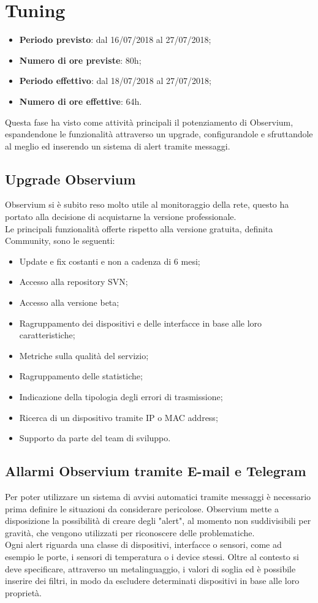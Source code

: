 \documentclass[Realizzazione.tex]{subfiles}
\begin{document}
\section{Tuning}
\begin{itemize}
	\item \textbf{Periodo previsto}: dal 16/07/2018 al 27/07/2018;
	\item \textbf{Numero di ore previste}: 80h;
	\item \textbf{Periodo effettivo}: dal 18/07/2018 al 27/07/2018;
	\item \textbf{Numero di ore effettive}: 64h.
\end{itemize}
Questa fase ha visto come attività principali il potenziamento di Observium, espandendone le funzionalità attraverso un upgrade, configurandole e sfruttandole al meglio ed inserendo un sistema di alert tramite messaggi.

\subsection{Upgrade Observium}
Observium si è subito reso molto utile al monitoraggio della rete, questo ha portato alla decisione di acquistarne la versione professionale. \\
Le principali funzionalità offerte rispetto alla versione gratuita, definita Community, sono le seguenti:
\begin{itemize}
	\item Update e fix costanti e non a cadenza di 6 mesi;
	\item Accesso alla repository SVN;
	\item Accesso alla versione beta;
	\item Ragruppamento dei dispositivi e delle interfacce in base alle loro caratteristiche;
	\item Metriche sulla qualità del servizio;
	\item Ragruppamento delle statistiche;
	\item Indicazione della tipologia degli errori di trasmissione;
	\item Ricerca di un dispositivo tramite IP o MAC address;
	\item Supporto da parte del team di sviluppo.
\end{itemize}

\subsection{Allarmi Observium tramite E-mail e Telegram}
Per poter utilizzare un sistema di avvisi automatici tramite messaggi è necessario prima definire le situazioni da considerare pericolose. Observium mette a disposizione la possibilità di creare degli "alert", al momento non suddivisibili per gravità, che vengono utilizzati per riconoscere delle problematiche. \\
Ogni alert riguarda una classe di dispositivi, interfacce o sensori, come ad esempio le porte, i sensori di temperatura o i device stessi. Oltre al contesto si deve specificare, attraverso un metalinguaggio, i valori di soglia ed è possibile inserire dei filtri, in modo da escludere determinati dispositivi in base alle loro proprietà.
\end{document}
